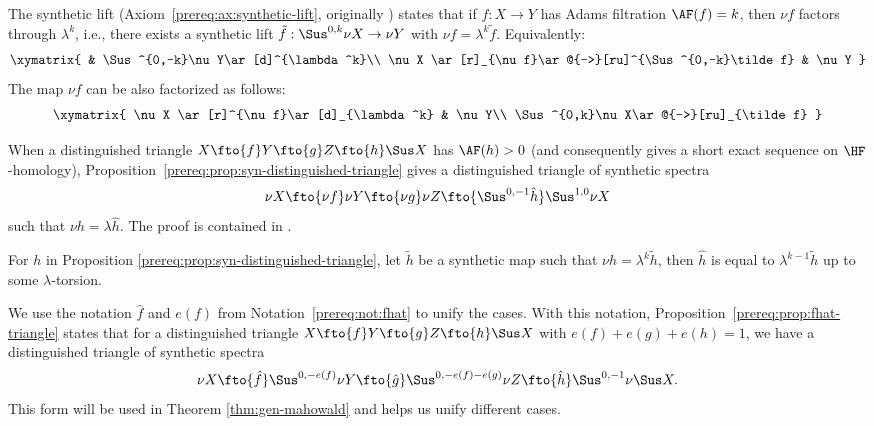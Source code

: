 The synthetic lift (Axiom~\ref{prereq:ax:synthetic-lift}, originally \cite[Lemma 9.15]{BHS}) states that if $f:X\to Y$ has Adams filtration $\AF(f)=k$, then $\nu f$ factors through $\lambda^k$, i.e., there exists a synthetic lift $\tilde f: \Sus^{0,k}\nu X\to \nu Y$ with $\nu f = \lambda^k \tilde f$. Equivalently:
$$\xymatrix{
 & \Sus^{0,-k}\nu Y\ar[d]^{\lambda^k}\\
 \nu X \ar[r]_{\nu f}\ar@{-->}[ru]^{\Sus^{0,-k}\tilde f} & \nu Y
}$$
The map $\nu f$ can be also factorized as follows:
$$\xymatrix{
 \nu X \ar[r]^{\nu f}\ar[d]_{\lambda^k} & \nu Y\\
 \Sus^{0,k}\nu X\ar@{-->}[ru]_{\tilde f}
}$$

When a distinguished triangle $X\fto{f} Y\fto{g} Z\fto{h} \Sus X$ has $\AF(h)>0$ (and consequently gives a short exact sequence on $\HF$-homology), Proposition~\ref{prereq:prop:syn-distinguished-triangle} gives a distinguished triangle of synthetic spectra
$$\nu X\fto{\nu f}\nu Y\fto{\nu g} \nu Z\fto{\Sus^{0,-1}\hat h} \Sus^{1,0}\nu X$$
such that $\nu h=\lambda \hat h$. The proof is contained in \cite[Lemma 9.15]{BHS}.

\begin{remark}
For $h$ in Proposition \ref{prereq:prop:syn-distinguished-triangle}, let $\tilde h$ be a synthetic map such that $\nu h=\lambda^k\tilde h$, then $\hat h$ is equal to $\lambda^{k-1}\tilde h$ up to some $\lambda$-torsion.
\end{remark}

We use the notation $\hat f$ and $e(f)$ from Notation~\ref{prereq:not:fhat} to unify the cases. With this notation, Proposition~\ref{prereq:prop:fhat-triangle} states that for a distinguished triangle $X\fto{f} Y\fto{g} Z\fto{h} \Sus X$ with $e(f)+e(g)+e(h)=1$, we have a distinguished triangle of synthetic spectra
$$\nu X\fto{\hat f} \Sus^{0,-e(f)}\nu Y\fto{\hat g} \Sus^{0,-e(f)-e(g)}\nu Z\fto{\hat h} \Sus^{0,-1}\nu \Sus X.$$
This form will be used in Theorem \ref{thm:gen-mahowald} and helps us unify different cases.

